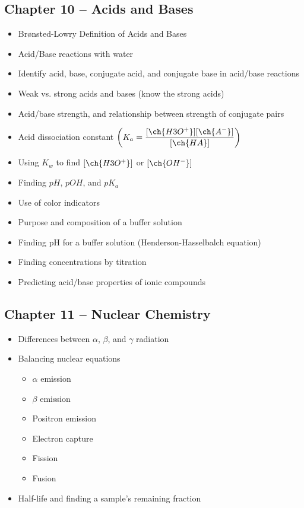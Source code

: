 \documentclass[12pt, letterpaper]{memoir}
\begin{document}
	\subsection*{Chapter 10 --  Acids and Bases}
	\begin{itemize}
		\item Br\o nsted-Lowry Definition of Acids and Bases
		\item Acid/Base reactions with water
		\item Identify acid, base, conjugate acid, and conjugate base in acid/base reactions
		\item Weak vs. strong acids and bases (know the strong acids)
		\item Acid/base strength, and relationship between strength of conjugate pairs
		\item Acid dissociation constant $\left(K_a=\dfrac{[\ch{H3O^+}][\ch{A^-}]}{[\ch{HA}]}\right)$
		\item Using $K_w$ to find $[\ch{H3O^+}]$ or $[\ch{OH^-}]$
		\item Finding $pH$, $pOH$, and $pK_a$
		\item Use of color indicators
		\item Purpose and composition of a buffer solution
		\item Finding pH for a buffer solution (Henderson-Hasselbalch equation)
		\item Finding concentrations by titration
		\item Predicting acid/base properties of ionic compounds
	\end{itemize}

	\subsection*{Chapter 11 --  Nuclear Chemistry}
	\begin{itemize}
		\item Differences between $\alpha$, $\beta$, and $\gamma$ radiation
		\item Balancing nuclear equations
		\begin{itemize}
			\item $\alpha$ emission
			\item $\beta$ emission
			\item Positron emission
			\item Electron capture
			\item Fission
			\item Fusion
		\end{itemize}
		\item Half-life and finding a sample's remaining fraction
	\end{itemize}
\end{document}

